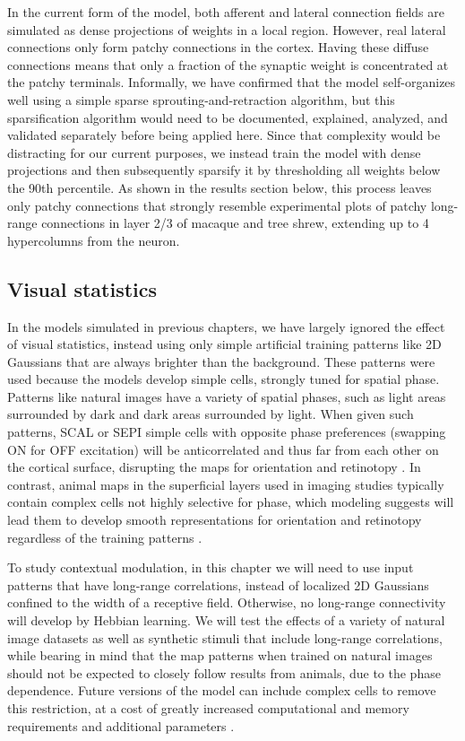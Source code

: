 In the current form of the model, both afferent and lateral connection
fields are simulated as dense projections of weights in a local
region. However, real lateral connections only form patchy connections
in the cortex. Having these diffuse connections means that only a
fraction of the synaptic weight is concentrated at the patchy
terminals. Informally, we have confirmed that the model self-organizes
well using a simple sparse sprouting-and-retraction algorithm, but
this sparsification algorithm would need to be documented, explained,
analyzed, and validated separately before being applied here. Since
that complexity would be distracting for our current purposes, we
instead train the model with dense projections and then subsequently
sparsify it by thresholding all weights below the 90th percentile. As
shown in the results section below, this process leaves only patchy
connections that strongly resemble experimental plots of patchy
long-range connections in layer 2/3 of macaque and tree shrew,
extending up to 4 hypercolumns from the neuron.

\subsection{Visual statistics}

In the models simulated in previous chapters, we have largely ignored
the effect of visual statistics, instead using only simple artificial
training patterns like 2D Gaussians that are always brighter than the
background.  These patterns were used because the models develop
simple cells, strongly tuned for spatial phase.  Patterns like natural
images have a variety of spatial phases, such as light areas
surrounded by dark and dark areas surrounded by light.  When given
such patterns, SCAL or SEPI simple cells with opposite phase
preferences (swapping ON for OFF excitation) will be anticorrelated
and thus far from each other on the cortical surface, disrupting the
maps for orientation and retinotopy \citep{Miikkulainen2005}.  In
contrast, animal maps in the superficial layers used in imaging
studies typically contain complex cells not highly selective for
phase, which modeling suggests will lead them to develop smooth
representations for orientation and retinotopy regardless of the
training patterns \citep{Antolik2010}.

To study contextual modulation, in this chapter we will need to use
input patterns that have long-range correlations, instead of localized
2D Gaussians confined to the width of a receptive
field.  Otherwise, no long-range connectivity will develop by Hebbian
learning.  We will test the effects of a variety of natural image
datasets as well as synthetic stimuli that include long-range
correlations, while bearing in mind that the map patterns when trained
on natural images should not be expected to closely follow results
from animals, due to the phase dependence.  Future versions of the
model can include complex cells to remove this restriction, at a cost
of greatly increased computational and memory requirements and
additional parameters \citep{Antolik2010}. 

